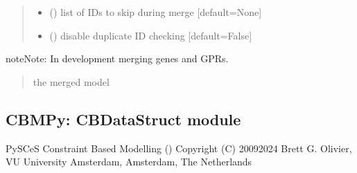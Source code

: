 \documentclass[letterpaper,12pt,english]{sphinxmanual}
\begin{document}
\begin{fulllineitems}
\begin{quote}
\begin{description}
\begin{itemize}
\item {} 
\sphinxAtStartPar
{} (\sphinxstyleliteralemphasis{\sphinxupquote{, }}) \textendash{} list of IDs to skip during merge {[}default=None{]}

\item {} 
\sphinxAtStartPar
{} (\sphinxstyleliteralemphasis{\sphinxupquote{, }}) \textendash{} disable duplicate ID checking {[}default=False{]}

\end{itemize}

\end{description}\end{quote}

\begin{sphinxadmonition}{note}{Note:}
\sphinxAtStartPar
In development \sphinxhyphen{} merging genes and GPRs.
\end{sphinxadmonition}
\begin{quote}\begin{description}
\sphinxAtStartPar
{} \textendash{} the merged model

\end{description}\end{quote}

\end{fulllineitems}


\subsection{CBMPy: CBDataStruct module}
\label{\detokenize{api/core:cbmpy-cbdatastruct-module}}\label{\detokenize{api/core:module-cbmpy.CBDataStruct}}
\sphinxAtStartPar
PySCeS Constraint Based Modelling ()
Copyright (C) 2009\sphinxhyphen{}2024 Brett G. Olivier, VU University Amsterdam, Amsterdam, The Netherlands
\end{document}
